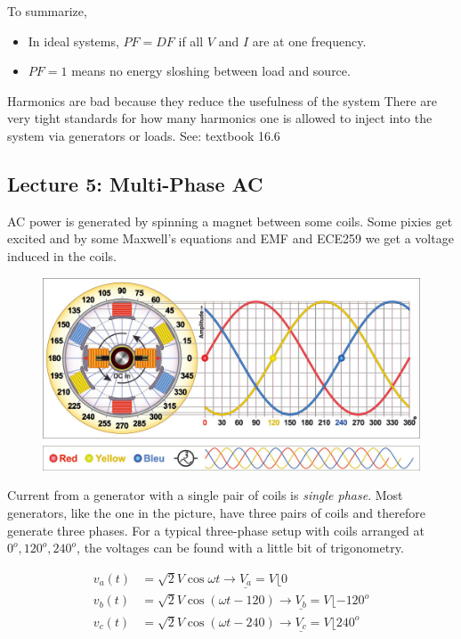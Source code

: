 \documentclass[../notes.tex]{subfiles}
\begin{document}
To summarize, 

\begin{itemize}
	\item In ideal systems, $ PF = DF $ if all $ V $ and $ I $ are at one frequency.
	\item $ PF = 1 $ means no energy sloshing between load and source.
\end{itemize}

Harmonics are bad because they reduce the usefulness of the system
There are very tight standards for how many harmonics one is allowed to inject into the system via generators or loads.
See: textbook 16.6




\subsection{Lecture 5: Multi-Phase AC}


AC power is generated by spinning a magnet between some coils.
Some pixies get excited and by some Maxwell's equations and EMF and ECE259 we get a voltage induced in the coils.

\begin{figure}[H]
	\centering
	\includegraphics[width=0.8\linewidth]{img/image_2022-09-17-21-36-37.png}
\end{figure}

Current from a generator with a single pair of coils is \textit{single phase}.
Most generators, like the one in the picture, have three pairs of coils and therefore generate three phases.
For a typical three-phase setup with coils arranged at $ 0^o, 120^o, 240^o $, the voltages can be found with a little bit of trigonometry.


\begin{equation}
	\begin{split}
		v_{a}(t) &= \sqrt{2} V \cos \omega t  \rightarrow \underline{V_{a}} = V \lfloor 0  \\
		v_{b}(t) &= \sqrt{2} V \cos( \omega t - 120) \rightarrow  \underline{V_{b}} = V \lfloor -120^o\\
		v_{c}(t) &= \sqrt{2} V \cos (\omega t - 240) \rightarrow \underline{V_{c}} = V \lfloor 240^o\\
	\end{split}
\end{equation}
\end{document}
